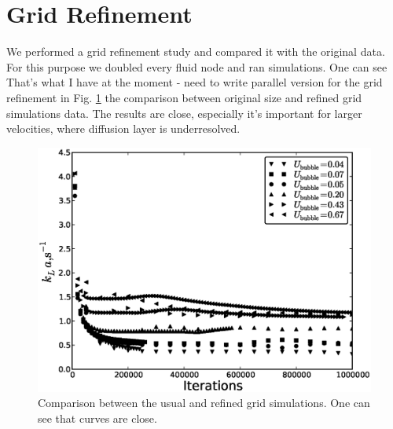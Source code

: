 \documentclass{article}
\begin{document}
\section{Grid Refinement}
We performed a grid refinement study and compared it with the original data. For this purpose we
doubled every fluid node and ran simulations. One can see {\color{red} That's what I have at the
moment - need to write parallel version for the grid refinement} in Fig. \ref{fig:grid:comparison}
the comparison between original size and refined grid simulations data. The results are close,
especially it's important for larger velocities, where diffusion layer is underresolved.
\begin{figure}[htb!]
\includegraphics[width=\textwidth]{Figures/steady_state_comparison_grid.eps}
\caption{Comparison between the usual and refined grid simulations. One
can see that curves are close.\label{fig:grid:comparison}}
\end{figure}

\appendix
\end{document}
